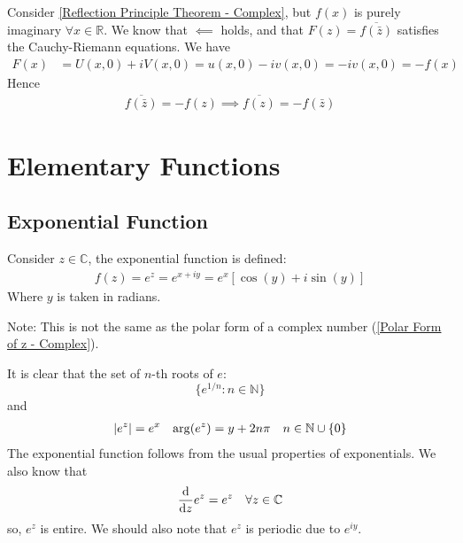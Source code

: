 \documentclass[12pt, english]{book}
\begin{document}
	\begin{example}
		\label{Reflection Principle f(x) purely imaginary Example - Complex}
		{\color{Grey}
		Consider \cref{Reflection Principle Theorem - Complex}, but \(f(x)\) is purely imaginary \(\forall x \in \mathbb{R}\). We know that \(\impliedby\) holds, and that \(F(z) = \overline{f(\bar{z})}\) satisfies the Cauchy-Riemann equations. We have 
		\begin{align*}
			F(x) &= U(x,0) + iV(x,0) = u(x,0) - iv(x,0) = -iv(x,0) = -f(x)
		\end{align*}
		Hence
		\begin{align*}
			\overline{f(\bar{z})} = -f(z) \implies \overline{f(z)} = -f(\bar{z})
		\end{align*}
		}
	\end{example}
	
	
	
	\chapter{Elementary Functions} \label{Elementary Functions Chapter - Complex}
	
	\section{Exponential Function} \label{Exponential Function Section - Complex}
	
	\begin{definition}
		\label{Exponential Function Definiton - Complex}
		Consider \(z \in \mathbb{C}\), the exponential function is defined:
		\begin{align*}
			f(z) = e^z = e^{x + iy} = e^x [\cos(y) + i\sin(y)]
		\end{align*}
		Where \(y\) is taken in radians. 
	\end{definition}
	Note: This is not the same as the polar form of a complex number (\cref{Polar Form of z - Complex}).
	
	It is clear that the set of \(n\)-th roots of \(e\):
	\[\{e^{1/n} : n \in \mathbb{N} \} \]
	and 
	\begin{align*}
		\abs{e^z} &= e^x & \operatorname{arg}(e^z) &= y + 2n\pi & n \in \mathbb{N}\cup \{0\}
	\end{align*}
	The exponential function follows from the usual properties of exponentials. We also know that 
	\begin{align*}
		\dv{z} e^z &= e^z & \forall z \in \mathbb{C}
	\end{align*}
	so, \(e^z\) is entire. We should also note that \(e^z\) is periodic due to \(e^{iy}\).
	
\end{document}
